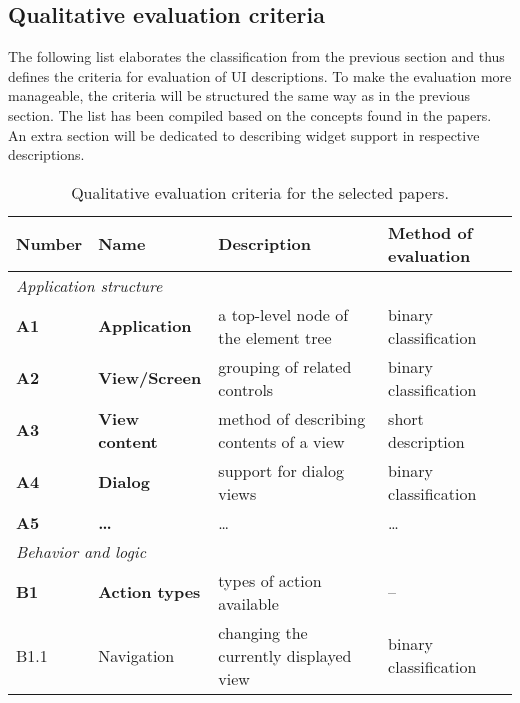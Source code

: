 \subsection{Qualitative evaluation criteria}\label{subsec:evaluation-criteria}

The following list elaborates the classification from the previous section and thus defines the criteria for evaluation of UI descriptions.
To make the evaluation more manageable, the criteria will be structured the same way as in the previous section.
The list has been compiled based on the concepts found in the papers.
An extra section will be dedicated to describing widget support in respective descriptions.

\begin{table}[]
    \caption{Qualitative evaluation criteria for the selected papers.}
    \label{tab:qualitative-evaluation-criteria}
    \begin{tabular}{@{}llll@{}}
        \toprule
        \textbf{Number} & \textbf{Name}                   & \textbf{Description}                                    & \textbf{Method of evaluation} \\ \midrule
        \multicolumn{4}{l}{\textit{Application structure}} \\ \midrule
        \textbf{A1}     & \textbf{Application}            & a top-level node of the element tree                    & binary classification         \\
        \textbf{A2}     & \textbf{View/Screen}            & grouping of related controls                            & binary classification         \\
        \textbf{A3}     & \textbf{View content}           & method of describing contents of a view                 & short description             \\
        \textbf{A4}     & \textbf{Dialog}                 & support for dialog views                                & binary classification         \\
        \textbf{A5}     & \textbf{\ldots}                 & \ldots                                                  & \ldots                        \\ \midrule
        \multicolumn{4}{l}{\textit{Behavior and logic}} \\ \midrule
        \textbf{B1}     & \textbf{Action types}           & types of action available                               & –                             \\
        B1.1            & Navigation                      & changing the currently displayed view                   & binary classification         \\

\end{tabular}
\end{table}
